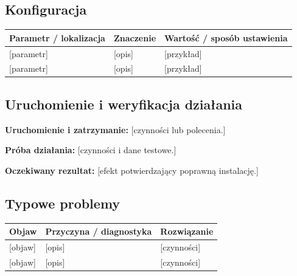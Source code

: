 \documentclass[11pt,a4paper,oneside]{article}
\newif\ifpodpowiedzi
\newcommand{\podpowiedz}[1]{\ifpodpowiedzi\par\begingroup\small\color{hintcolor}\textit{Wskazówka: #1}\par\endgroup\fi}
\newcommand{\pole}[1]{\textnormal{[#1]}}
\begin{document}
\subsection{Konfiguracja}
\podpowiedz{Wskaż pliki konfiguracyjne, zmienne środowiskowe i ustawienia usług. Wyjaśnij znaczenie parametrów, wymagane wartości i miejsca ich zmiany. Uwzględnij porty, ścieżki, połączenia, konta i uprawnienia, jeśli występują. Używaj przykładowych wartości; nie wpisuj rzeczywistych haseł, tokenów ani kluczy. Wyjaśnij, jak osoba wdrażająca projekt ma dostarczyć własne dane dostępowe.}
\begin{tabularx}{\textwidth}{@{}Y Y Y@{}}
\toprule
Parametr / lokalizacja & Znaczenie & Wartość / sposób ustawienia\\
\midrule
\pole{parametr} & \pole{opis} & \pole{przykład}\\
\pole{parametr} & \pole{opis} & \pole{przykład}\\
\bottomrule
\end{tabularx}
\podpowiedz{Jeśli AI jest częścią rozwiązania, opisz wymagane modele, usługę lub środowisko lokalne, sposób konfiguracji dostępu, sprawdzoną wersję modelu, o ile można ją ustalić, oraz zależności i limity istotne dla uruchomienia. Samo użycie AI podczas tworzenia projektu nie wymaga takiego opisu tutaj.}

\subsection{Uruchomienie i weryfikacja działania}
\podpowiedz{Opisz pierwsze uruchomienie, zatrzymanie i ponowne uruchomienie rozwiązania. Podaj sposób sprawdzenia gotowości komponentów, lokalizację logów i krótki scenariusz potwierdzający poprawność instalacji. Wskaż dane potrzebne do próby oraz konkretny oczekiwany rezultat. Dla złożonego projektu sprawdź także połączenia między komponentami.}
\textbf{Uruchomienie i zatrzymanie:} \pole{czynności lub polecenia.}\par
\textbf{Próba działania:} \pole{czynności i dane testowe.}\par
\textbf{Oczekiwany rezultat:} \pole{efekt potwierdzający poprawną instalację.}

\subsection{Typowe problemy}
\podpowiedz{Opisz rzeczywiście napotkane lub przewidywalne problemy instalacyjne i konfiguracyjne. Podaj objaw, sposób ustalenia przyczyny oraz działanie naprawcze. Wskaż logi lub polecenia diagnostyczne, jeśli pomagają. Dodaj wiersze według potrzeb.}
\begin{tabularx}{\textwidth}{@{}Y Y Y@{}}
\toprule
Objaw & Przyczyna / diagnostyka & Rozwiązanie\\
\midrule
\pole{objaw} & \pole{opis} & \pole{czynności}\\
\pole{objaw} & \pole{opis} & \pole{czynności}\\
\bottomrule
\end{tabularx}
\end{document}
